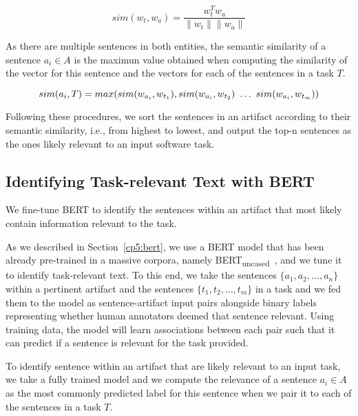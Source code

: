 \begin{equation}
    sim(w_t,w_a) = \frac{w_t^Tw_a}{\|w_t\| \|w_a\|}
    \label{eq:word-sim}
\end{equation}
 
\smallskip
 As there are multiple sentences in both entities, the semantic similarity of a sentence $a_i \in A$ is the maximun value obtained when computing the similarity of the vector for this sentence and the vectors for each of the sentences in a task $T$.

 \begin{equation}
    sim(a_i, T) = max(sim(w_{a_i}, w_{t_1}), sim(w_{a_i}, w_{t_2}) ~\dots~ sim(w_{a_i}, w_{t_m})) \\
\end{equation}

\smallskip
Following these procedures, we sort the sentences in an artifact according to their semantic similarity, i.e., from highest to lowest, and output the top-n sentences as the ones likely relevant to an input software task.


\subsection{Identifying Task-relevant Text with BERT}
\label{cp5:approach-bert}



We fine-tune BERT to identify the sentences within an artifact that most likely contain information relevant to the task.



As we described in Section~\ref{cp5:bert}, we use a BERT model that has been already pre-trained in a massive corpora, namely BERT\textsubscript{uncased}~\cite{Devlin2018Bert}, and we tune it to identify task-relevant text.
To this end, we take the sentences $\{a_1, a_2, \dots, a_n\}$ within a pertinent artifact and the sentences $\{t_1, t_2, \dots, t_m\}$ in a task and we fed them to the model as sentence-artifact input pairs 
alongside binary labels representing whether human annotators deemed that sentence relevant. 
Using training data, the model will learn associations between each pair such that it can predict if a sentence is relevant for the task provided. 






To identify sentence within an artifact that are likely relevant to an input task, we take a fully trained model and we compute the relevance of a sentence $a_i \in A$ as the most commonly predicted label for this sentence when we pair it to each of the sentences in a task $T$.

